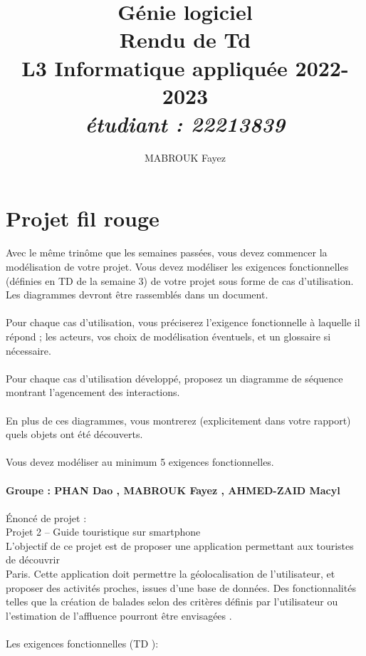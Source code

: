 \documentclass[12pt]{article}
\date{}
\author{MABROUK Fayez}
\title{{\bf  Génie logiciel} \\
	Rendu de Td \no 9  \\
	{\small L3 Informatique appliquée 2022-2023} \\
	{\it \small \no étudiant : 22213839}}
\begin{document}
	\maketitle
	\newpage
	\section{Projet fil rouge}
	Avec le même trinôme que les semaines passées, vous devez commencer la modélisation de votre
	projet. Vous devez modéliser les exigences fonctionnelles (définies en TD de la semaine 3) de votre
	projet sous forme de cas d’utilisation. Les diagrammes devront être rassemblés dans un document.\\
	\\
	Pour chaque cas d’utilisation, vous préciserez l’exigence fonctionnelle à laquelle il répond ; les
	acteurs, vos choix de modélisation éventuels, et un glossaire si nécessaire.\\
	\\
	Pour chaque cas d’utilisation développé, proposez un diagramme de séquence montrant
	l’agencement des interactions.\\
	\\
	En plus de ces diagrammes, vous montrerez (explicitement dans votre rapport) quels objets ont été
	découverts.\\
	\\
	Vous devez modéliser au minimum 5 exigences fonctionnelles.
	\\
	\\
	\textbf{Groupe : PHAN Dao , MABROUK Fayez , AHMED-ZAID Macyl}
	 \\
	 \\
	Énoncé de projet : \\
	Projet 2 – Guide touristique sur smartphone \\
	L’objectif de ce projet est de proposer une application permettant aux touristes de découvrir\\
	Paris. Cette application doit permettre la géolocalisation de l’utilisateur, et proposer des
	activités proches, issues d’une base de données. Des fonctionnalités telles que la création de
	balades selon des critères définis par l’utilisateur ou l’estimation de l’affluence pourront être
	envisagées .\\
	\\
	Les exigences fonctionnelles (TD ):\\
\end{document}
